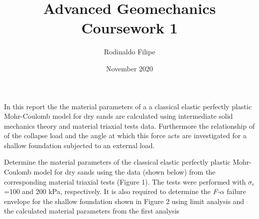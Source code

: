 \documentclass{article}
\title{Advanced Geomechanics Coursework 1}
\author{Rodinaldo Filipe}
\date{November 2020}
\affil{University of Liverpool}
\begin{document}
\maketitle

\label{H_799FC059}



\vspace{1em}

\label{H_E66718DF}

\begin{par}
\begin{flushleft}
In this report the the material parameters of a a classical elastic perfectly plastic Mohr-Coulomb model for dry sands are calculated using intermediate solid mechanics theory and material triaxial tests data. Furthermore the relationship of of the collapse load and the angle at which this force acts are investigated for a shallow foundation subjected to an external load.  
\end{flushleft}
\end{par}


\label{H_CEFDCA03}

\begin{par}
\begin{flushleft}
Determine the material parameters of the classical elastic perfectly plastic Mohr-Coulomb model for dry sands using the data (shown below) from the corresponding material triaxial tests (Figure 1). The tests were performed with $\sigma_{r}$\textit{ }=100 and 200 kPa, respectively. It is also required to determine the \textit{F-}$\alpha$\textit{ } failure envelope for the shallow foundation shown in Figure 2 using limit analysis and the calculated material parameters from the first analysis
\end{flushleft}
\end{par}
\end{document}
